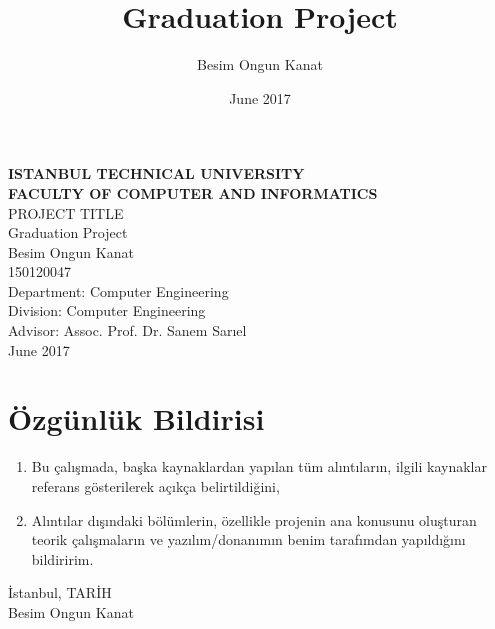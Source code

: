 \documentclass[a4paper, 12pt, titlepage]{article}
\title{Graduation Project}
\author{Besim Ongun Kanat}
\date{June 2017}
\begin{document}

\begin{titlepage}
    \bfseries %
    \sffamily %
	\begin{center}
		\LARGE{\textbf{ISTANBUL TECHNICAL UNIVERSITY \\ 
               FACULTY OF COMPUTER AND INFORMATICS} } \\
		\vspace{5.5cm}
		\LARGE{PROJECT TITLE}  \\
		\vspace{4.5cm}
		\Large{Graduation Project} \\
        \vspace{0.5cm}
		\Large{Besim Ongun Kanat} \\
     	\Large{150120047} \\
        \vspace{4cm}
        \large{Department: Computer Engineering} \\
        \large{Division: Computer Engineering} \\
        \vspace{1.5cm}
        \large{Advisor: Assoc. Prof. Dr. Sanem Sarıel} \\
		\vspace{\fill} %
		\large{\normalfont \sffamily June 2017}
	\end{center}
\end{titlepage}

\newpage
\section*{Özgünlük Bildirisi}
\begin{enumerate}
    \item Bu çalışmada, başka kaynaklardan yapılan tüm alıntıların, ilgili kaynaklar \\ referans gösterilerek açıkça belirtildiğini,
    \item Alıntılar dışındaki bölümlerin, özellikle projenin ana konusunu oluşturan teorik çalışmaların ve yazılım/donanımın benim tarafımdan yapıldığını
    bildiririm.
\end{enumerate}
\vspace{1em}
İstanbul, TARİH
\vspace{3em}\\Besim Ongun Kanat
\end{document}
